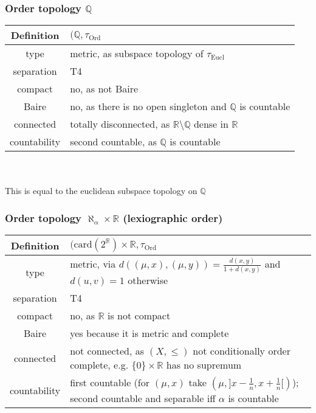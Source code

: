 \documentclass{scrartcl}
\newcommand{\R}{\mathbb{R}}
\newcommand{\Q}{\mathbb{Q}}
\begin{document}
\subsubsection{Order topology $\Q$}

\begin{tabular}{c | p{}}
    Definition & $(\Q, \tau_{\mathrm{Ord}}$ \\
    \hline
    type & metric, as subspace topology of $\tau_{\mathrm{Eucl}}$ \\
    separation & T4 \\
    compact & no, as not Baire \\
    Baire & no, as there is no open singleton and $\Q$ is countable \\
    connected & totally disconnected, as $\R \setminus \Q$ dense in $\R$ \\
    countability & second countable, as $\Q$ is countable
\end{tabular}
\\\\
This is equal to the euclidean subspace topology on $\Q$ 

\subsubsection{Order topology $\aleph_\alpha \times \R$ (lexiographic order)}

\begin{tabular}{c | p{}}
    Definition & $(\mathrm{card}(2^\R) \times \R, \tau_{\mathrm{Ord}}$ \\
    \hline
    type & metric, via $d((\mu, x), (\mu, y)) = \frac{d(x, y)}{1 + d(x, y)}$ and $d(u, v) = 1$ otherwise \\
    separation & T4 \\
    compact & no, as $\R$ is not compact \\
    Baire & yes because it is metric and complete \\
    connected & not connected, as $(X, \leq)$ not conditionally order complete, e.g. $\{0\} \times \R$ has no supremum \\
    countability & first countable (for $(\mu, x)$ take $(\mu, ]x - \frac 1 n, x + \frac 1 n[)$); second countable and separable iff $\alpha$ is countable
\end{tabular}
\end{document}
